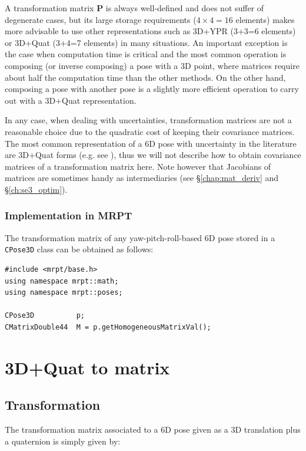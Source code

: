 \documentclass[a4paper,11pt]{report}
\begin{document}
A transformation matrix $\mathbf{P}$ is always well-defined and does not suffer of degenerate cases, but its large
storage requirements ($4\times 4=16$ elements) makes more advisable to use other representations such 
as 3D+YPR (3+3=6 elements) or 3D+Quat (3+4=7 elements) in many situations. 
An important exception is the case when computation time is critical and the most common operation 
is composing (or inverse composing) a pose with a 3D point, where matrices require about half the 
computation time than the other methods. On the other hand, composing a pose with another pose is 
a slightly more efficient operation to carry out with a 3D+Quat representation. 

In any case, when dealing with uncertainties, transformation matrices are not a 
reasonable choice due to the 
quadratic cost of keeping their covariance matrices. 
The most common representation of a 6D pose with uncertainty in the literature 
are 3D+Quat forms (e.g. see \cite{davison2007mrt}), thus 
we will not describe how to 
obtain covariance matrices of a transformation matrix here.
Note however that Jacobians of matrices are sometimes handy 
as intermediaries (see \S\ref{chap:mat_deriv} and \S\ref{ch:se3_optim}).


\subsubsection{Implementation in MRPT}

The transformation matrix of any yaw-pitch-roll-based 6D pose stored in a 
\texttt{CPose3D} class can be obtained as follows:

\begin{lstlisting}
#include <mrpt/base.h> 
using namespace mrpt::math; 
using namespace mrpt::poses; 

CPose3D          p;
CMatrixDouble44  M = p.getHomogeneousMatrixVal();
\end{lstlisting}


\section{3D+Quat to matrix }
\label{sect:quat2mat}

\subsection{Transformation}

The transformation matrix associated to a 6D pose given as a 3D translation plus 
a quaternion is simply given by:
\end{document}
